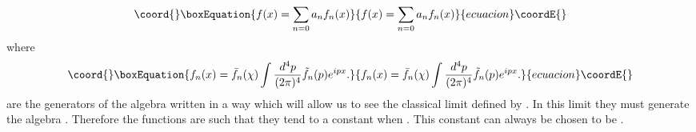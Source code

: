 \documentclass[a4paper,12pt]{article}
\begin{document}
\begin{equation}\coord{}\boxEquation{
f(x)=\sum_{n=0}a_{n}f_{n}(x)
}{
f(x)=\sum_{n=0}a_{n}f_{n}(x)
}{ecuacion}\coordE{}\end{equation}
where
\begin{equation}\coord{}\boxEquation{
f_{n}(x) = \bar{f}_{n}(\chi)\int
\frac{d^4p}{(2{\pi})^4}\tilde{f}_{n}(p) e^{ipx}.
}{
f_{n}(x) = \bar{f}_{n}(\chi)\int
\frac{d^4p}{(2{\pi})^4}\tilde{f}_{n}(p) e^{ipx}.
}{ecuacion}\coordE{}\end{equation}
\coordHE{} are the generators of the algebra \coordHE{}
written in a way which will allow us to see the classical limit
defined by \coordHE{} . In this limit they must
generate the algebra \coordHE{} . Therefore the functions
\coordHE{} are such that they tend to a constant when
\coordHE{} . This constant can always be chosen to
be \coordHE{}  .

\vskip 5mm
\vskip 5mm
\noindent
\end{document}
